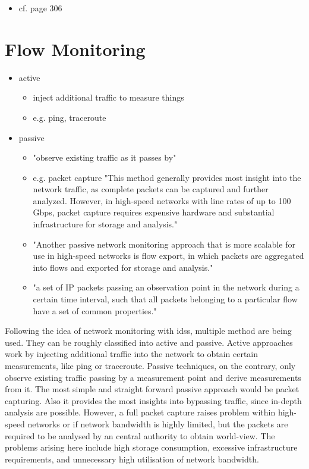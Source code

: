 	\begin{itemize}
		\item cf. \textcite{Whitman2009} page 306 
	\end{itemize}
	
\section{Flow Monitoring}
\label{sec:background:network:netflow}

	\begin{itemize}
		\item active
			\begin{itemize}
				\item inject additional traffic to measure things \parencite{Hofstede2014}
				\item e.g. ping, traceroute
			\end{itemize}
		\item passive
			\begin{itemize}
				\item "observe existing traffic as it passes by" \parencite{Hofstede2014}
				\item e.g. packet capture "This method generally provides most insight into the network traffic, as complete packets can be captured and further analyzed. However, in high-speed networks with line rates of up to 100 Gbps, packet capture requires expensive hardware and substantial infrastructure for storage and analysis." \parencite{Hofstede2014}
				\item "Another passive network monitoring approach that is more scalable for use in high-speed networks is flow export, in which packets are aggregated into flows and exported for storage and analysis." \parencite{Hofstede2014}
				\item  "a set of IP packets passing an observation point in the network during a certain time interval, such that all packets belonging to a particular flow have a set of common properties." \parencite{Claise2013}
				
			\end{itemize}
	\end{itemize}

Following the idea of network monitoring with \glspl{ids}, multiple method are being used. They can be roughly classified into active and passive. 
Active approaches work by injecting additional traffic into the network to obtain certain measurements, like ping or traceroute.
Passive techniques, on the contrary, only observe existing traffic passing by a measurement point and derive measurements from it. The most simple and straight forward passive approach would be packet capturing. Also it provides the most insights into bypassing traffic, since in-depth analysis are possible. However, a full packet capture raises problem within high-speed networks or if network bandwidth is highly limited, but the packets are required to be analysed by an central authority to obtain world-view. The problems arising here include high storage consumption, excessive infrastructure requirements, and unnecessary high utilisation of network bandwidth.
\parencite[cf.][]{Hofstede2014}

